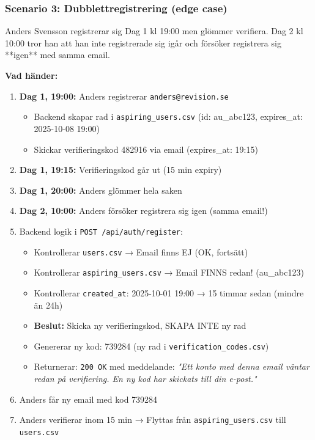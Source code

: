 \documentclass[12pt,a4paper]{article}
\begin{document}
\subsubsection{Scenario 3: Dubblettregistrering (edge case)}
Anders Svensson registrerar sig Dag 1 kl 19:00 men glömmer verifiera. Dag 2 kl 10:00 tror han att han inte registrerade sig igår och försöker registrera sig **igen** med samma email.

\textbf{Vad händer:}
\begin{enumerate}[noitemsep]
  \item \textbf{Dag 1, 19:00:} Anders registrerar \texttt{anders@revision.se}
  \begin{itemize}[noitemsep]
    \item Backend skapar rad i \texttt{aspiring\_users.csv} (id: au\_abc123, expires\_at: 2025-10-08 19:00)
    \item Skickar verifieringskod 482916 via email (expires\_at: 19:15)
  \end{itemize}
  \item \textbf{Dag 1, 19:15:} Verifieringskod går ut (15 min expiry)
  \item \textbf{Dag 1, 20:00:} Anders glömmer hela saken
  \item \textbf{Dag 2, 10:00:} Anders försöker registrera sig igen (samma email!)
  \item Backend logik i \texttt{POST /api/auth/register}:
  \begin{itemize}[noitemsep]
    \item Kontrollerar \texttt{users.csv} → Email finns EJ (OK, fortsätt)
    \item Kontrollerar \texttt{aspiring\_users.csv} → Email FINNS redan! (au\_abc123)
    \item Kontrollerar \texttt{created\_at}: 2025-10-01 19:00 → 15 timmar sedan (mindre än 24h)
    \item \textbf{Beslut:} Skicka ny verifieringskod, SKAPA INTE ny rad
    \item Genererar ny kod: 739284 (ny rad i \texttt{verification\_codes.csv})
    \item Returnerar: \texttt{200 OK} med meddelande: \textit{"Ett konto med denna email väntar redan på verifiering. En ny kod har skickats till din e-post."}
  \end{itemize}
  \item Anders får ny email med kod 739284
  \item Anders verifierar inom 15 min → Flyttas från \texttt{aspiring\_users.csv} till \texttt{users.csv}
\end{enumerate}
\end{document}
